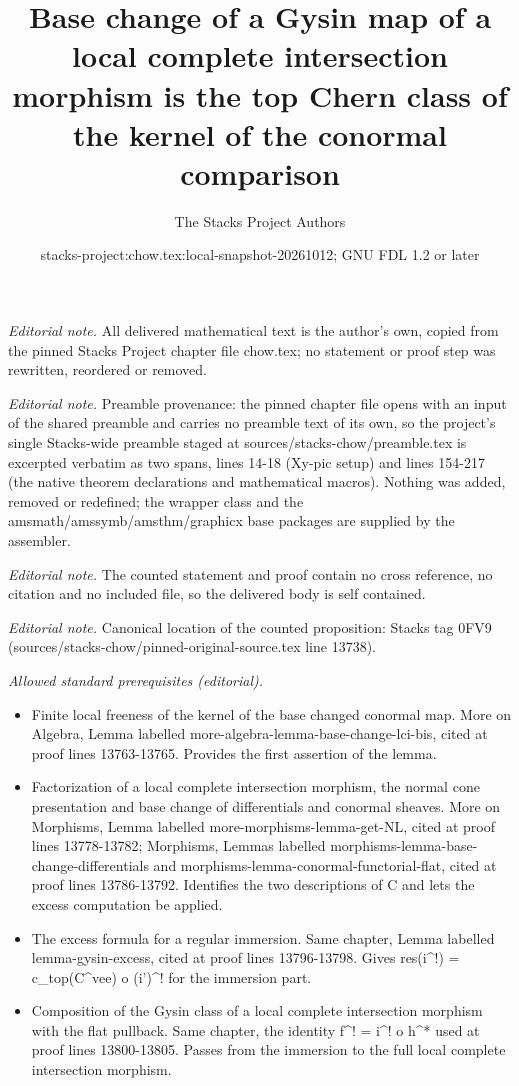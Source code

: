 \documentclass[10pt,a4paper]{amsart}
\title{Base change of a Gysin map of a local complete intersection morphism is the top Chern class of the kernel of the conormal comparison}
\author{The Stacks Project Authors}
\date{stacks-project:chow.tex:local-snapshot-20261012; GNU FDL 1.2 or later}
\theoremstyle{plain}
\theoremstyle{definition}
\theoremstyle{remark}
\numberwithin{equation}{subsection}
\begin{document}
\maketitle
\noindent\textit{Editorial note.} All delivered mathematical text is the author's own, copied from the pinned Stacks Project chapter file chow.tex; no statement or proof step was rewritten, reordered or removed.\par\medskip
\noindent\textit{Editorial note.} Preamble provenance: the pinned chapter file opens with an input of the shared preamble and carries no preamble text of its own, so the project's single Stacks-wide preamble staged at sources/stacks-chow/preamble.tex is excerpted verbatim as two spans, lines 14-18 (Xy-pic setup) and lines 154-217 (the native theorem declarations and mathematical macros). Nothing was added, removed or redefined; the wrapper class and the amsmath/amssymb/amsthm/graphicx base packages are supplied by the assembler.\par\medskip
\noindent\textit{Editorial note.} The counted statement and proof contain no cross reference, no citation and no included file, so the delivered body is self contained.\par\medskip
\noindent\textit{Editorial note.} Canonical location of the counted proposition: Stacks tag 0FV9 (sources/stacks-chow/pinned-original-source.tex line 13738).\par\medskip
\noindent\textit{Allowed standard prerequisites (editorial).}\begin{itemize}
\item Finite local freeness of the kernel of the base changed conormal map. More on Algebra, Lemma labelled more-algebra-lemma-base-change-lci-bis, cited at proof lines 13763-13765. Provides the first assertion of the lemma.
\item Factorization of a local complete intersection morphism, the normal cone presentation and base change of differentials and conormal sheaves. More on Morphisms, Lemma labelled more-morphisms-lemma-get-NL, cited at proof lines 13778-13782; Morphisms, Lemmas labelled morphisms-lemma-base-change-differentials and morphisms-lemma-conormal-functorial-flat, cited at proof lines 13786-13792. Identifies the two descriptions of C and lets the excess computation be applied.
\item The excess formula for a regular immersion. Same chapter, Lemma labelled lemma-gysin-excess, cited at proof lines 13796-13798. Gives res(i\textasciicircum{}!) = c\_top(C\textasciicircum{}vee) o (i')\textasciicircum{}! for the immersion part.
\item Composition of the Gysin class of a local complete intersection morphism with the flat pullback. Same chapter, the identity f\textasciicircum{}! = i\textasciicircum{}! o h\textasciicircum{}* used at proof lines 13800-13805. Passes from the immersion to the full local complete intersection morphism.
\end{itemize}\medskip
\end{document}

